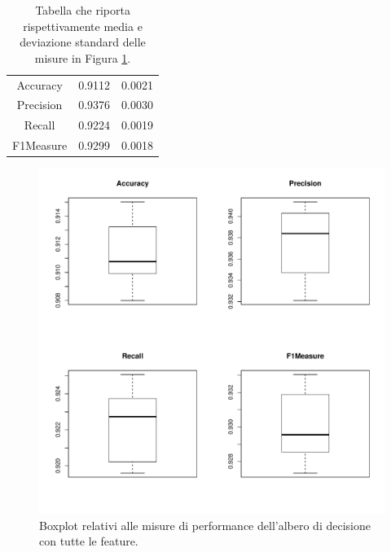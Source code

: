 \begin{table}
	\caption{Tabella che riporta rispettivamente media e deviazione standard delle misure in Figura \ref{fig:treeperformance}.}
	\label{tab:treeperformance}
	\centering
	\begin{tabular}{c|c|c}
		Accuracy & 0.9112 & 0.0021 \\ 
		Precision & 0.9376 & 0.0030 \\
		Recall & 0.9224 & 0.0019 \\
		F1Measure & 0.9299 & 0.0018 \\
	\end{tabular}
\end{table}
\begin{figure}
	\centering
	\includegraphics[width=0.7\linewidth]{../FinalResults/Tree_performance}
	\caption{Boxplot relativi alle misure di performance dell'albero di decisione con tutte le feature.}
	\label{fig:treeperformance}
\end{figure}
